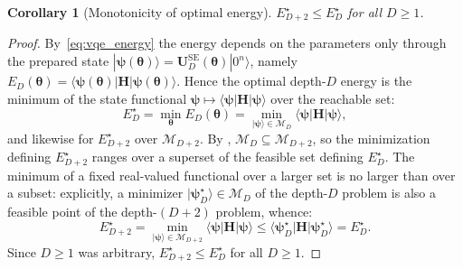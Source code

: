 \documentclass[11pt]{article}
\newcommand{\cM}{\mathcal{M}}
\newtheorem{corollary}[theorem]{Corollary}
\theoremstyle{plain}
\theoremstyle{plain}
\begin{document}
\begin{corollary}[Monotonicity of optimal energy]
\label{cor:energy_monotone}
  $E_{D+2}^\star\le E_D^\star$ for all $D\ge 1$.
\end{corollary}
\begin{proof}
By~\eqref{eq:vqe_energy} the energy depends on the parameters only
through the prepared state
$|\boldsymbol{\psi}(\bm\theta)\rangle=\mathbf{U}_D^{\mathrm{SE}}(\bm\theta)|0^n\rangle$,
namely $E_D(\bm\theta)=\langle\boldsymbol{\psi}(\bm\theta)|\mathbf{H}|\boldsymbol{\psi}(\bm\theta)\rangle$.
Hence the optimal depth-$D$ energy is the minimum of the
state functional $\boldsymbol{\psi}\mapsto\langle\boldsymbol{\psi}|\mathbf{H}|\boldsymbol{\psi}\rangle$
over the reachable set: 
\begin{equation}\label{eq:Estar_def}
  E_D^\star
  = \min_{\bm\theta}E_D(\bm\theta)
  = \min_{|\boldsymbol{\psi}\rangle\in\cM_D}
    \langle\boldsymbol{\psi}|\mathbf{H}|\boldsymbol{\psi}\rangle,
\end{equation}
and likewise for $E_{D+2}^\star$ over $\cM_{D+2}$. By
, $\cM_D\subseteq\cM_{D+2}$, so the minimization
defining $E_{D+2}^\star$ ranges over a superset of the feasible set
defining $E_D^\star$. The minimum of a fixed real-valued functional
over a larger set is no larger than over a subset: explicitly, a minimizer
$|\boldsymbol{\psi}_D^\star\rangle\in\cM_D$ of the depth-$D$ problem is also a
feasible point of the depth-$(D{+}2)$ problem, whence:
\begin{equation}\label{eq:Estar_mono}
  E_{D+2}^\star
  = \min_{|\boldsymbol{\psi}\rangle\in\cM_{D+2}}
    \langle\boldsymbol{\psi}|\mathbf{H}|\boldsymbol{\psi}\rangle
  \le \langle\boldsymbol{\psi}_D^\star|\mathbf{H}|\boldsymbol{\psi}_D^\star\rangle
  = E_D^\star.
\end{equation}
Since $D\ge 1$ was arbitrary, $E_{D+2}^\star\le E_D^\star$ for all
$D\ge 1$.
\end{proof}
\end{document}

